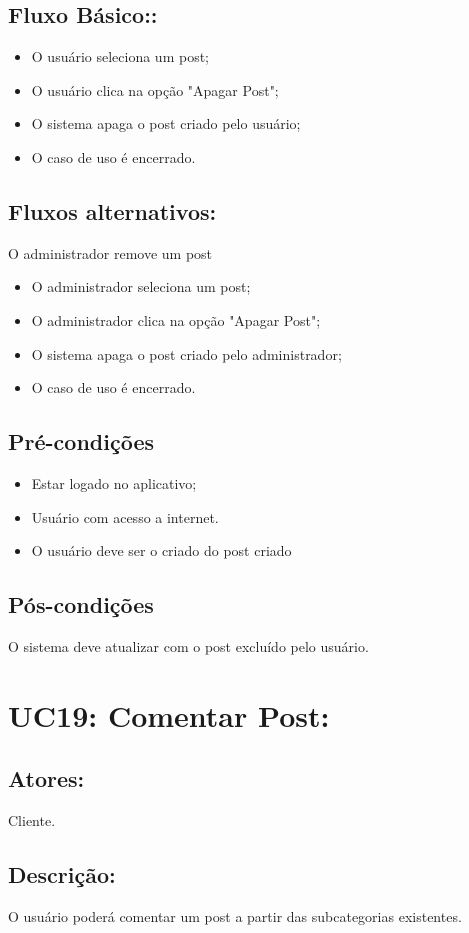 \subsection{Fluxo Básico::}

\begin{itemize}
    \item O usuário seleciona um post;
    \item O usuário clica na opção "Apagar Post";
    \item O sistema apaga o post criado pelo usuário;
    \item O caso de uso é encerrado.
\end{itemize}
\subsection{Fluxos alternativos:}
O administrador remove um post
\begin{itemize}
    \item O administrador seleciona um post;
    \item O administrador clica na opção "Apagar Post";
    \item O sistema apaga o post criado pelo administrador;
    \item O caso de uso é encerrado. 
\end{itemize}
\subsection{Pré-condições}
\begin{itemize}
    \item Estar logado no aplicativo;
    \item Usuário com acesso a internet. 
    \item O usuário deve ser o criado do post criado
\end{itemize}
\subsection{Pós-condições}
O sistema deve atualizar com o post excluído pelo usuário.  
\section{UC19: Comentar Post: }

\subsection{Atores:}
 Cliente. 
\subsection{Descrição:}
  O usuário poderá comentar um post a partir das subcategorias existentes. 
